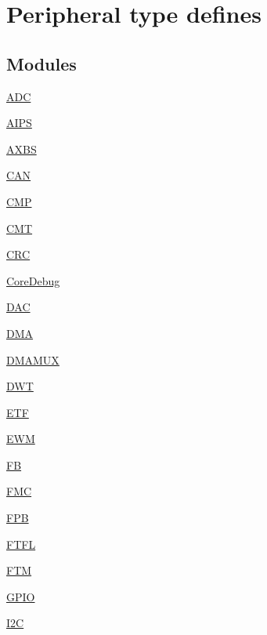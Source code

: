 \hypertarget{group___peripheral__defines}{}\section{Peripheral type defines}
\label{group___peripheral__defines}
\subsection*{Modules}
\begin{DoxyCompactItemize}
\item 
\hyperlink{group___a_d_c___peripheral}{A\+DC}
\item 
\hyperlink{group___a_i_p_s___peripheral}{A\+I\+PS}
\item 
\hyperlink{group___a_x_b_s___peripheral}{A\+X\+BS}
\item 
\hyperlink{group___c_a_n___peripheral}{C\+AN}
\item 
\hyperlink{group___c_m_p___peripheral}{C\+MP}
\item 
\hyperlink{group___c_m_t___peripheral}{C\+MT}
\item 
\hyperlink{group___c_r_c___peripheral}{C\+RC}
\item 
\hyperlink{group___core_debug___peripheral}{Core\+Debug}
\item 
\hyperlink{group___d_a_c___peripheral}{D\+AC}
\item 
\hyperlink{group___d_m_a___peripheral}{D\+MA}
\item 
\hyperlink{group___d_m_a_m_u_x___peripheral}{D\+M\+A\+M\+UX}
\item 
\hyperlink{group___d_w_t___peripheral}{D\+WT}
\item 
\hyperlink{group___e_t_f___peripheral}{E\+TF}
\item 
\hyperlink{group___e_w_m___peripheral}{E\+WM}
\item 
\hyperlink{group___f_b___peripheral}{FB}
\item 
\hyperlink{group___f_m_c___peripheral}{F\+MC}
\item 
\hyperlink{group___f_p_b___peripheral}{F\+PB}
\item 
\hyperlink{group___f_t_f_l___peripheral}{F\+T\+FL}
\item 
\hyperlink{group___f_t_m___peripheral}{F\+TM}
\item 
\hyperlink{group___g_p_i_o___peripheral}{G\+P\+IO}
\item 
\hyperlink{group___i2_c___peripheral}{I2C}
\item 

\end{DoxyCompactItemize}

